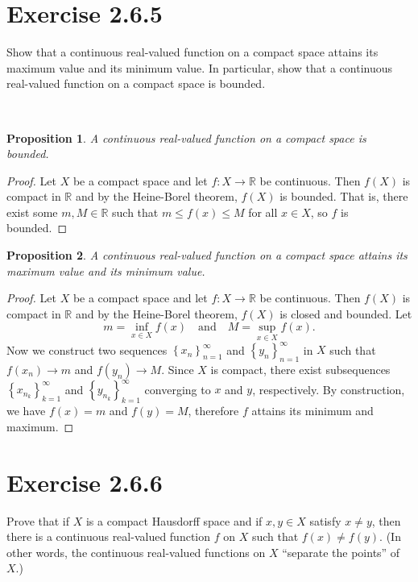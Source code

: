 \documentclass[12pt]{article}
\newtheorem{proposition}{Proposition}
\newenvironment{problem}
    {\begin{lrbox}{\mybox}\begin{minipage}{\textwidth-10pt}}
    {\end{minipage}\end{lrbox}\framebox[6.5in]{\usebox{\mybox}}\\}
\newcommand{\isp}[1]{\quad\text{#1}\quad}
\newcommand{\seq}[2]{\left\{#1\right\}_{#2=1}^\infty}
\newcommand{\R}{\mathbb{R}}
\begin{document}
\section*{Exercise 2.6.5}
\begin{problem}
    Show that a continuous real-valued function on a compact space attains its maximum value and its minimum value. In particular, show that a continuous real-valued function on a compact space is bounded.
\end{problem}

\begin{proposition}
    A continuous real-valued function on a compact space is bounded.
\end{proposition}

\begin{proof}
    Let $X$ be a compact space and let $f:X\to\R$ be continuous. Then $f(X)$ is compact in $\R$ and by the Heine-Borel theorem, $f(X)$ is bounded. That is, there exist some $m,M\in\R$ such that $m\leq f(x)\leq M$ for all $x\in X$, so $f$ is bounded.
    
\end{proof}

\begin{proposition}
    A continuous real-valued function on a compact space attains its maximum value and its minimum value.
\end{proposition}

\begin{proof}
    Let $X$ be a compact space and let $f:X\to\R$ be continuous. Then $f(X)$ is compact in $\R$ and by the Heine-Borel theorem, $f(X)$ is closed and bounded. Let
    \[m=\inf_{x\in X}f(x) \isp{and} M=\sup_{x\in X}f(x).\]
    Now we construct two sequences $\seq{x_n}{n}$ and $\seq{y_n}{n}$ in $X$ such that $f(x_n)\to m$ and $f(y_n)\to M$. Since $X$ is compact, there exist subsequences $\seq{x_{n_k}}{k}$ and $\seq{y_{n_k}}{k}$ converging to $x$ and $y$, respectively. By construction, we have $f(x)=m$ and $f(y)=M$, therefore $f$ attains its minimum and maximum.
    
\end{proof}

\section*{Exercise 2.6.6}
\begin{problem}
    Prove that if $X$ is a compact Hausdorff space and if $x,y\in X$ satisfy $x\ne y$, then there is a continuous real-valued function $f$ on $X$ such that $f(x)\ne f(y)$. (In other words, the continuous real-valued functions on $X$ ``separate the points'' of $X$.)
\end{problem}
\end{document}
